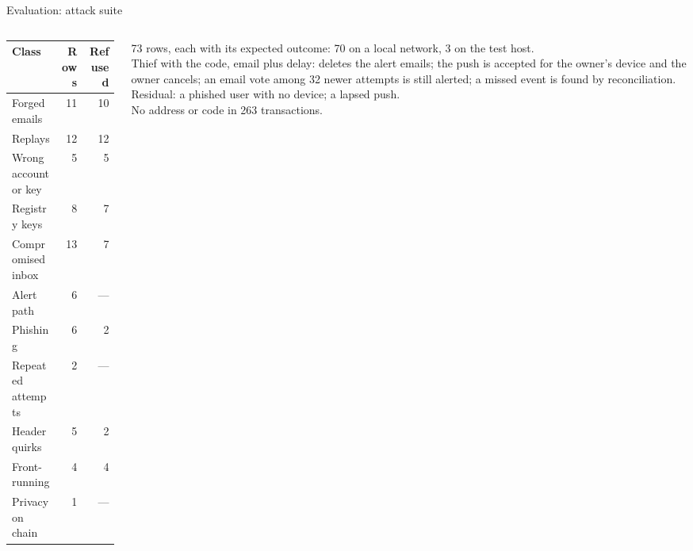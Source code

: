 \documentclass[aspectratio=169,11pt]{beamer}
\begin{document}
\begin{frame}{Evaluation: attack suite}
  \small
  \begin{columns}[T]
    \begin{column}{0.5\textwidth}
      \footnotesize
      \begin{tabular}{@{}lrr@{}}
        \toprule
        Class & Rows & Refused \\
        \midrule
        Forged emails & 11 & 10 \\
        Replays & 12 & 12 \\
        Wrong account or key & 5 & 5 \\
        Registry keys & 8 & 7 \\
        Compromised inbox & 13 & 7 \\
        Alert path & 6 & --- \\
        Phishing & 6 & 2 \\
        Repeated attempts & 2 & --- \\
        Header quirks & 5 & 2 \\
        Front-running & 4 & 4 \\
        Privacy on chain & 1 & --- \\
        \bottomrule
      \end{tabular}
    \end{column}
    \begin{column}{0.48\textwidth}
      \footnotesize
      73 rows, each with its expected outcome: 70 on a local network, 3 on
      the test host.\\[4pt]
      Thief with the code, email plus delay: deletes the alert emails; the
      push is accepted for the owner's device and the owner cancels; an email
      vote among 32 newer attempts is still alerted; a missed event is found
      by reconciliation.\\[4pt]
      Residual: a phished user with no device; a lapsed push.\\[4pt]
      No address or code in 263 transactions.
    \end{column}
  \end{columns}
\end{frame}
\end{document}
